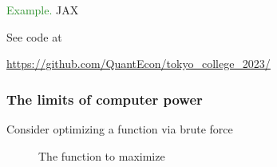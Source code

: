 \documentclass[
    xcolor={svgnames,dvipsnames},
    hyperref={colorlinks, citecolor=DeepPink4, linkcolor=DarkRed, urlcolor=DarkBlue}
    ]{beamer}  %
\newcommand{\Eg}{\textcolor{ForestGreen}{Example. }}
\newcommand{\1}{\mathbbm 1}
\begin{document}



\begin{frame}

    \Eg JAX 

    \vspace{0.5em}
    \vspace{0.5em}
    \vspace{0.5em}
    \vspace{0.5em}
    \vspace{0.5em}
    See code at
    \begin{center}
        \url{https://github.com/QuantEcon/tokyo_college_2023/}
    \end{center}

\end{frame}




\begin{frame}
    \frametitle{The limits of computer power}


    Consider optimizing a function via brute force
        
\end{frame}




\begin{frame}
    
    \begin{figure}
       \begin{center}
           \caption{The function to maximize}
       \end{center}
    \end{figure}

\end{frame}
\end{document}
